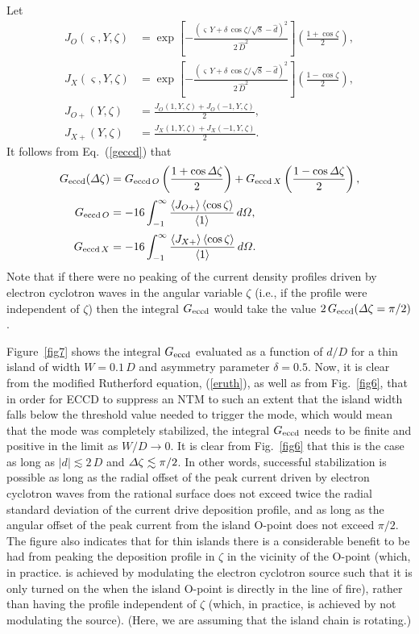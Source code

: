 \documentclass[12pt,prb,aps]{revtex4-1}
\begin{document}
Let 
\begin{align}
J_O(\varsigma,Y,\zeta) &=  \exp\!\left[-\frac{(\varsigma\,Y+\delta\,\cos\zeta/\sqrt{8}-\hat{d})^2}{2\,\hat{D}^2}\right]\left(\frac{1+\cos\zeta}{2}\right),\\[0.5ex]
J_X(\varsigma,Y,\zeta) &=  \exp\!\left[-\frac{(\varsigma\,Y+\delta\,\cos\zeta/\sqrt{8}-\hat{d})^2}{2\,\hat{D}^2}\right]\left(\frac{1-\cos\zeta}{2}\right),\\[0.5ex]
J_{O+}(Y,\zeta) &= \frac{J_O(1,Y,\zeta) + J_O(-1,Y,\zeta)}{2},\\[0.5ex]
J_{X+}(Y,\zeta) &= \frac{J_X(1,Y,\zeta) + J_X(-1,Y,\zeta)}{2}.
\end{align}
It follows from Eq.~(\ref{geccd}) that
\begin{align}
G_{\rm eccd}({\mit\Delta}\zeta)& = G_{{\rm eccd}\,O}\left(\frac{1+\cos{\mit\Delta}\zeta}{2}\right)+G_{{\rm eccd}\,X}\left(\frac{1-\cos{\mit\Delta}\zeta}{2}\right),\\[0.5ex]
G_{{\rm eccd}\,O} &= - 16\int_{-1}^\infty \frac{\langle J_{O+}\rangle\,\langle \cos\zeta\rangle}{\langle 1\rangle}\,d{\mit\Omega},\\[0.5ex]
G_{{\rm eccd}\,X} &= - 16\int_{-1}^\infty \frac{\langle J_{X+}\rangle\,\langle \cos\zeta\rangle}{\langle 1\rangle}\,d{\mit\Omega}.
\end{align}
Note that if there were no peaking of the current density profiles driven by electron cyclotron waves in the angular variable $\zeta$ (i.e., if the profile were
independent of $\zeta$) then the integral $G_{\rm eccd}$ would take the value  $2\,G_{\rm eccd}({\mit\Delta}\zeta= \pi/2)$.

Figure~\ref{fig7} shows the integral $G_{\rm eccd}$ evaluated as a function of $d/D$ for a thin island of width $W=0.1\,D$ and asymmetry parameter
$\delta=0.5$. Now, it is clear from the modified Rutherford equation, (\ref{eruth}), as well as from  Fig.~\ref{fig6}, that in order for ECCD to suppress an NTM to
such an extent that the island width falls below the threshold value needed to trigger the mode, which would mean that the mode was completely
stabilized, the integral $G_{\rm eccd}$ needs to be finite and positive in the limit as $W/D\rightarrow 0$. It is clear from Fig.~\ref{fig6} that this is the case
as long as $|d|\lesssim 2\,D$ and ${\mit\Delta}\zeta\lesssim \pi/2$. In other words, successful stabilization is possible as long as the radial
offset of the peak current driven by electron cyclotron waves from the rational surface does not exceed twice the radial standard deviation of the current drive deposition profile, 
and as long as the angular offset of the peak current from the island O-point does not exceed $\pi/2$. The figure also indicates that for thin islands
there is a considerable benefit to be had from peaking the deposition profile in $\zeta$ in the vicinity of the O-point (which, in practice. is achieved by
modulating the electron cyclotron source such that it is only turned on the when the island O-point is directly in the line of fire), rather than having the profile independent of
$\zeta$ (which, in practice, is achieved by not modulating the source).\cite{ece6} (Here, we are assuming that the island chain is rotating.)
\end{document}
